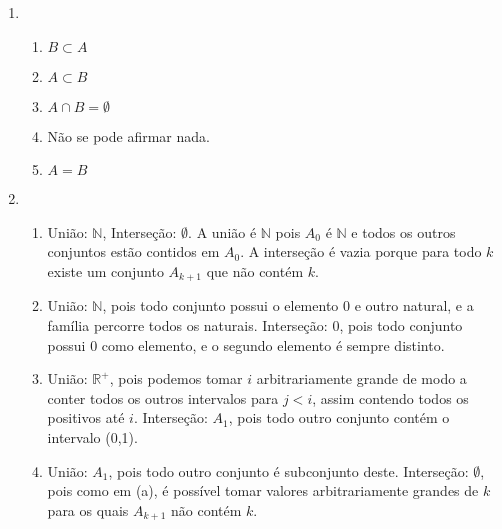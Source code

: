 \documentclass{article}
\begin{document}
\begin{enumerate}
\begin{enumerate}
        \end{enumerate}

    \item 

        \begin{enumerate}

            \item \( B \subset A \)

            \item \( A \subset B \)

            \item \( A \cap B = \emptyset \)

            \item Não se pode afirmar nada.

            \item \( A = B \)

        \end{enumerate}

    \item 

        \begin{enumerate}

             \item União: \( \mathbb{N} \), Interseção: \( \emptyset \). A união é \( \mathbb{N} \) pois \( A_0 \) é \( \mathbb{N} \) e todos os outros conjuntos estão contidos em \( A_0 \). A interseção é vazia porque para todo \( k \) existe um conjunto \( A_{k+1} \) que não contém \( k \).

             \item União: \( \mathbb{N} \), pois todo conjunto possui o elemento 0 e outro natural, e a família percorre todos os naturais. Interseção: \( 0 \), pois todo conjunto possui 0 como elemento, e o segundo elemento é sempre distinto.

             \item União: \( \mathbb{R}^{+} \), pois podemos tomar \( i \) arbitrariamente grande de modo a conter todos os outros intervalos para \( j < i \), assim contendo todos os positivos até \( i \). Interseção: \( A_1\), pois todo outro conjunto contém o intervalo (0,1).

             \item União: \( A_1 \), pois todo outro conjunto é subconjunto deste. Interseção: \( \emptyset \), pois como em (a), é possível tomar valores arbitrariamente grandes de \( k \) para os quais \( A_{k+1} \) não contém \( k \).

            \end{enumerate}
        
\end{enumerate}
\end{document}
